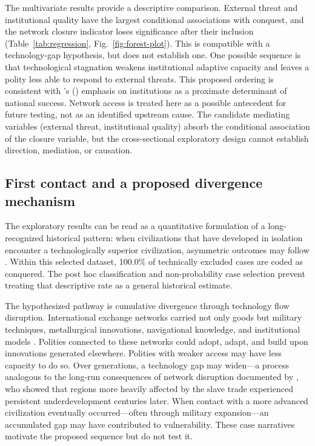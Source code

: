 \documentclass[pdflatex,sn-basic]{sn-jnl}
\theoremstyle{thmstyleone}%
\theoremstyle{thmstyletwo}%
\theoremstyle{thmstylethree}%
\begin{document}
The multivariate results provide a descriptive comparison. External threat and institutional quality have the largest conditional associations with conquest, and the network closure indicator loses significance after their inclusion (Table~\ref{tab:regression}, Fig.~\ref{fig:forest-plot}). This is compatible with a technology-gap hypothesis, but does not establish one. One possible sequence is that technological stagnation weakens institutional adaptive capacity and leaves a polity less able to respond to external threats. This proposed ordering is consistent with \citeauthor{AcemogluRobinson2012}'s (\citeyear{AcemogluRobinson2012}) emphasis on institutions as a proximate determinant of national success. Network access is treated here as a possible antecedent for future testing, not as an identified upstream cause. The candidate mediating variables (external threat, institutional quality) absorb the conditional association of the closure variable, but the cross-sectional exploratory design cannot establish direction, mediation, or causation.

\subsection{First contact and a proposed divergence mechanism}\label{sec:disc-firstcontact}

The exploratory results can be read as a quantitative formulation of a long-recognized historical pattern: when civilizations that have developed in isolation encounter a technologically superior civilization, asymmetric outcomes may follow \citep{Diamond1997, DiamondBellwood2003}. Within this selected dataset, 100.0\% of technically excluded cases are coded as conquered. The post hoc classification and non-probability case selection prevent treating that descriptive rate as a general historical estimate.

The hypothesized pathway is cumulative divergence through technology flow disruption. International exchange networks carried not only goods but military techniques, metallurgical innovations, navigational knowledge, and institutional models \citep{Mokyr2002, Pomeranz2000}. Polities connected to these networks could adopt, adapt, and build upon innovations generated elsewhere. Polities with weaker access may have less capacity to do so. Over generations, a technology gap may widen---a process analogous to the long-run consequences of network disruption documented by \citet{Nunn2008}, who showed that regions more heavily affected by the slave trade experienced persistent underdevelopment centuries later. When contact with a more advanced civilization eventually occurred---often through military expansion---an accumulated gap may have contributed to vulnerability. These case narratives motivate the proposed sequence but do not test it.
\end{document}
